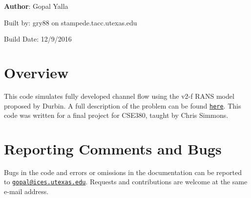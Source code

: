 {\bfseries Author}: Gopal Yalla

Built by: gry88 on stampede.tacc.utexas.edu

Build Date: 12/9/2016 

\hypertarget{index_Overview}{}\section{Overview}\label{index_Overview}
This code simulates fully developed channel flow using the v2-\/f RANS model proposed by Durbin. A full description of the problem can be found \href{http://users.ices.utexas.edu/~gopal/public/Problem_Statement.pdf}{\tt here}. This code was written for a final project for CSE380, taught by Chris Simmons.\hypertarget{index_bugs}{}\section{Reporting Comments and Bugs}\label{index_bugs}
Bugs in the code and errors or omissions in the documentation can be reported to \href{mailto:gopal@ices.utexas.edu}{\tt gopal@ices.utexas.edu}. Requests and contributions are welcome at the same e-\/mail address. 